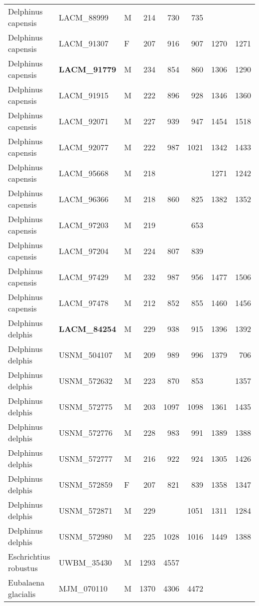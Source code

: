 \begin{table}[ht]
\begin{tabular}{lllrrrrr}
  Delphinus capensis & LACM\_88999 & M & 214 & 730 & 735 &  &  \\ 
  Delphinus capensis & LACM\_91307 & F & 207 & 916 & 907 & 1270 & 1271 \\ 
  Delphinus capensis & \textbf{ LACM\_91779 } & M & 234 & 854 & 860 & 1306 & 1290 \\ 
  Delphinus capensis & LACM\_91915 & M & 222 & 896 & 928 & 1346 & 1360 \\ 
  Delphinus capensis & LACM\_92071 & M & 227 & 939 & 947 & 1454 & 1518 \\ 
  Delphinus capensis & LACM\_92077 & M & 222 & 987 & 1021 & 1342 & 1433 \\ 
  Delphinus capensis & LACM\_95668 & M & 218 &  &  & 1271 & 1242 \\ 
  Delphinus capensis & LACM\_96366 & M & 218 & 860 & 825 & 1382 & 1352 \\ 
  Delphinus capensis & LACM\_97203 & M & 219 &  & 653 &  &  \\ 
  Delphinus capensis & LACM\_97204 & M & 224 & 807 & 839 &  &  \\ 
  Delphinus capensis & LACM\_97429 & M & 232 & 987 & 956 & 1477 & 1506 \\ 
  Delphinus capensis & LACM\_97478 & M & 212 & 852 & 855 & 1460 & 1456 \\ 
  Delphinus delphis & \textbf{ LACM\_84254 } & M & 229 & 938 & 915 & 1396 & 1392 \\ 
  Delphinus delphis & USNM\_504107 & M & 209 & 989 & 996 & 1379 & 706 \\ 
  Delphinus delphis & USNM\_572632 & M & 223 & 870 & 853 &  & 1357 \\ 
  Delphinus delphis & USNM\_572775 & M & 203 & 1097 & 1098 & 1361 & 1435 \\ 
  Delphinus delphis & USNM\_572776 & M & 228 & 983 & 991 & 1389 & 1388 \\ 
  Delphinus delphis & USNM\_572777 & M & 216 & 922 & 924 & 1305 & 1426 \\ 
  Delphinus delphis & USNM\_572859 & F & 207 & 821 & 839 & 1358 & 1347 \\ 
  Delphinus delphis & USNM\_572871 & M & 229 &  & 1051 & 1311 & 1284 \\ 
  Delphinus delphis & USNM\_572980 & M & 225 & 1028 & 1016 & 1449 & 1388 \\ 
  Eschrichtius robustus & UWBM\_35430 & M & 1293 & 4557 &  &  &  \\ 
  Eubalaena glacialis & MJM\_070110 & M & 1370 & 4306 & 4472 &  &  \\ 

\end{tabular}
\end{table}
